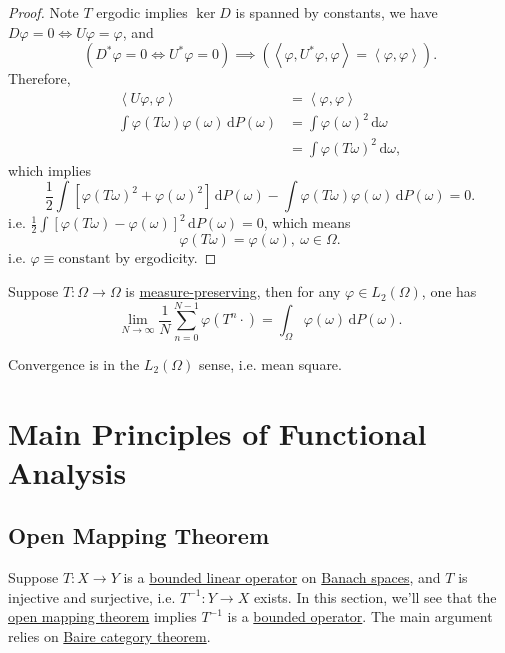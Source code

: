 \begin{proof}
	Note \(T\) ergodic implies \(\ker{D}\) is spanned by constants, we have \(D \varphi = 0 \Leftrightarrow U\varphi = \varphi\), and
	\[
		(D^{\ast} \varphi = 0 \Leftrightarrow U^{\ast} \varphi = 0) \implies (\left\langle \varphi, U^{\ast} \varphi, \varphi \right\rangle  = \left\langle \varphi, \varphi \right\rangle ).
	\]
	Therefore,
	\begin{align*}
		\left\langle U \varphi, \varphi \right\rangle                 & = \left\langle \varphi, \varphi \right\rangle   \\
		\int \varphi(T \omega) \varphi(\omega) \,\mathrm{d} P(\omega) & =\int \varphi(\omega)^2 \,\mathrm{d} \omega     \\
		                                                              & = \int \varphi(T \omega)^2 \,\mathrm{d} \omega,
	\end{align*}
	which implies
	\[
		\frac{1}{2} \int [\varphi(T \omega)^2 + \varphi(\omega)^2] \,\mathrm{d} P(\omega) - \int \varphi(T \omega) \varphi(\omega) \,\mathrm{d} P(\omega) = 0.
	\]
	i.e. \(\frac{1}{2} \int[\varphi(T \omega) - \varphi(\omega)]^2 \,\mathrm{d} P(\omega) = 0\), which means
	\[
		\varphi(T \omega) = \varphi(\omega),\ \omega \in \Omega.
	\]
	i.e. \(\varphi \equiv \text{constant}\) by ergodicity.
\end{proof}

\begin{theorem}\label{von-Newmann-ergodic}
	Suppose \(T\colon \Omega \to \Omega\) is \hyperref[def:measure-preserving]{measure-preserving}, then for any \(\varphi \in L_2(\Omega)\), one has
	\[
		\lim_{N \to \infty} \frac{1}{N} \sum_{n=0}^{N-1} \varphi(T^n \cdot) = \int_\Omega \varphi(\omega) \,\mathrm{d} P(\omega).
	\]
\end{theorem}
\begin{remark}
	Convergence is in the \(L_2(\Omega)\) sense, i.e. mean square.
\end{remark}

\chapter{Main Principles of Functional Analysis}

\section{Open Mapping Theorem}

Suppose \(T\colon X \to Y\) is a \hyperref[def:bounded-linear-op]{bounded linear operator} on \hyperref[def:Banach-space]{Banach spaces}, and \(T\) is injective and surjective, i.e. \(T^{-1}\colon Y \to X\) exists. In this section, we'll see that the \hyperref[thm:open-mapping]{open mapping theorem} implies \(T^{-1}\) is a \hyperref[rmk:bounded-op]{bounded operator}. The main argument relies on \hyperref[prop:Baire-category]{Baire category theorem}.


